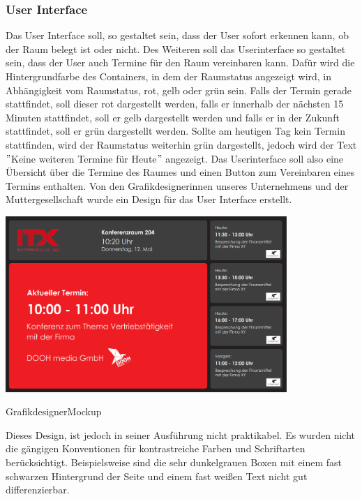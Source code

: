 \subsubsection{User Interface}\label{subsec:user-interface}
Das User Interface soll, so gestaltet sein, dass der User sofort erkennen kann, ob der Raum belegt ist oder nicht.
Des Weiteren soll das Userinterface so gestaltet sein, dass der User auch Termine für den Raum vereinbaren kann.
Dafür wird die Hintergrundfarbe des Containers, in dem der Raumstatus angezeigt wird, in Abhängigkeit vom Raumstatus, rot, gelb oder grün sein.
Falls der Termin gerade stattfindet, soll dieser rot dargestellt werden, falls er innerhalb der nächsten 15 Minuten stattfindet, soll er gelb dargestellt werden und falls er in der Zukunft stattfindet, soll er grün dargestellt werden.
Sollte am heutigen Tag kein Termin stattfinden, wird der Raumstatus weiterhin grün dargestellt, jedoch wird der Text \("\)Keine weiteren Termine für Heute\("\) angezeigt.
Das Userinterface soll also eine Übersicht über die Termine des Raumes und einen Button zum Vereinbaren eines Termins enthalten.
\newline
Von den Grafikdesignerinnen unseres Unternehmens und der Muttergesellschaft wurde ein Design für das User Interface erstellt.
\newline
\newline
\par\vspace{1cm}
\centering
\includegraphics[width=0.8\textwidth]{Bilder/GrafikdesignerMockup}
\caption{GrafikdesignerMockup}
\label{fig:GrafikdesignerMockup}
\par\vspace{1cm}
\raggedright
Dieses Design, ist jedoch in seiner Ausführung nicht praktikabel.
Es wurden nicht die gängigen Konventionen für kontrastreiche Farben und Schriftarten berücksichtigt.
Beispielsweise sind die sehr dunkelgrauen Boxen mit einem fast schwarzen Hintergrund der Seite und einem fast weißen Text nicht gut differenzierbar.
